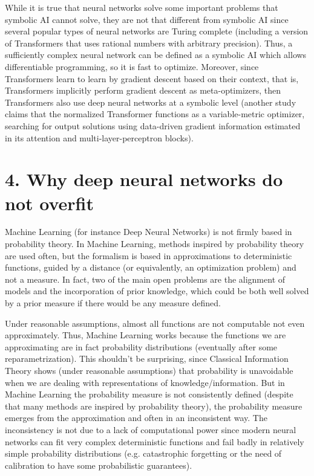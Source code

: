\documentclass[11pt]{book}
\begin{document}
While it is true that neural networks solve some important problems that
symbolic AI cannot solve, they are not that different from symbolic AI
since several popular types of neural networks are Turing
complete\cite{perez_turing_2019} (including a version of Transformers that uses rational
numbers with arbitrary precision). Thus, a sufficiently complex neural
network can be defined as a symbolic AI which allows differentiable
programming\cite{hernandez_differentiable_2022}, so it is fast to optimize. Moreover, since
Transformers learn to learn by gradient descent based on their context,
that is, Transformers implicitly perform gradient descent as
meta-optimizers\cite{von_oswald_transformers_2023}, then Transformers also use deep neural networks
at a symbolic level (another
study\cite{loshchilov_ngpt_2024} claims that the normalized Transformer
functions as a variable-metric optimizer, searching for output solutions
using data-driven gradient information estimated in its attention and
multi-layer-perceptron blocks).

\hypertarget{why-deep-neural-networks-do-not-overfit}{%
\section{4. Why deep neural networks do not
overfit}\label{why-deep-neural-networks-do-not-overfit}}

Machine Learning (for instance Deep Neural Networks) is not firmly based
in probability theory. In Machine Learning, methods inspired by
probability theory are used
often\cite{hennig_probabilistic_2022}, but the formalism is based in approximations to
deterministic functions, guided by a distance (or equivalently, an
optimization problem) and not a measure. In fact, two of the main open
problems are the alignment of models and the incorporation of prior
knowledge\cite{muller_transformers_2022}, which could be both well solved by a prior measure if there
would be any measure defined.

Under reasonable assumptions, almost all functions are not computable
not even approximately. Thus, Machine Learning works because the
functions we are approximating are in fact probability distributions
(eventually after some
reparametrization\cite{bojun_utility-probability_2023}). This shouldn't be surprising, since Classical
Information Theory shows (under reasonable assumptions) that probability
is unavoidable when we are dealing with representations of
knowledge/information\cite{novak_tractability_2008}\cite{hennig_probabilistic_2022}. But in Machine Learning the probability measure is not
consistently defined (despite that many methods are inspired by
probability theory), the probability measure emerges from the
approximation\cite{bojun_utility-probability_2023} and often in an inconsistent way. The inconsistency is
not due to a lack of computational power since modern neural networks
can fit very complex deterministic functions and fail
badly\cite{lakshminarayanan_simple_2017}\cite{de_grancey_object_2022} in relatively simple probability distributions (e.g. catastrophic
forgetting or the need of calibration to have some probabilistic
guarantees\cite{de_grancey_object_2022}).
\end{document}
